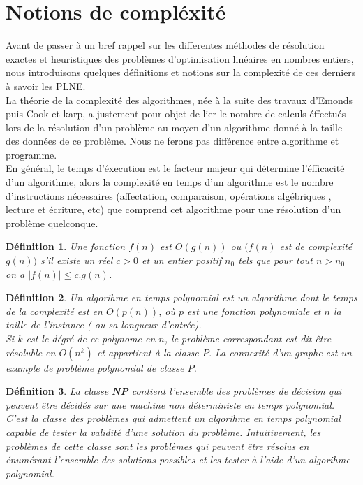 \documentclass[a4paper,11pt,oneside]{report}
\theoremstyle{plain}
\newtheorem{definition}{D\'efinition}[section]
\newcommand{\0}{/ \! \! \! 0}
\theoremstyle{plain}
\begin{document}
\section{Notions de compl\'exit\'e}
Avant de passer \`a un bref rappel sur les differentes m\'ethodes de r\'esolution exactes et heuristiques des probl\`emes d'optimisation
lin\'eaires en nombres entiers, nous introduisons quelques d\'efinitions et notions sur la complexit\'e de ces derniers \`a savoir les
PLNE.\\ La th\'eorie de la complexit\'e des algorithmes, n\'ee \`a la suite des travaux d'Emonds puis Cook et karp, a justement pour objet
 de lier le nombre de calculs \'effectu\'es lors de la r\'esolution d'un probl\`eme au moyen d'un algorithme donn\'e \`a la taille des 
 donn\'ees de ce probl\`eme. Nous ne ferons pas diff\'erence entre algorithme et programme.\\
 En g\'en\'eral, le temps d'\'execution est le facteur majeur qui d\'etermine l'\'efficacit\'e d'un algorithme, alors la complexit\'e en temps 
 d'un algorithme est le nombre d'instructions n\'ecessaires (affectation, comparaison, op\'erations alg\'ebriques , lecture et \'ecriture,
 etc) que comprend cet algorithme pour une r\'esolution d'un probl\`eme quelconque.
\begin{definition}
 Une fonction $f(n)$ est $O(g(n))$ ou $(f(n)$ est de complexit\'e $g(n))$ s'il existe un r\'eel $c>0$ et un entier positif $n_0$ tels que
 pour tout $n>n_0$ on a $|f(n)| \leq c.g(n)$.
\end{definition}
\begin{definition}
 Un algorihme en temps polynomial est un algorithme dont le temps de la complexit\'e est en $O(p(n))$, o\`u $p$ est une fonction polynomiale
  et $n$ la taille de l'instance ( ou sa longueur d'entr\'ee).\\
 Si $k$ est le d\'egr\'e de ce polynome en $n$, le probl\`eme correspondant est dit \^etre r\'esoluble en $O(n^k)$ et appartient \`a la classe $P$. 
 La connexit\'e d'un graphe est un example de probl\`eme polynomial de classe $P$.
 \end{definition}
\begin{definition}
 La classe {\bf NP} contient l'ensemble des probl\`emes de d\'ecision qui peuvent \^etre d\'ecid\'es sur une machine non d\'eterministe en temps polynomial.
 C'est la classe des probl\`emes qui admettent un algorihme en temps polynomial capable de tester la validit\'e d'une solution du probl\`eme.
 Intuitivement, les probl\`emes de cette classe sont les probl\`emes qui peuvent \^etre r\'esolus en \'enum\'erant l'ensemble des solutions possibles et
  les tester \`a l'aide d'un algorihme polynomial.
 \end{definition}
\end{document}
